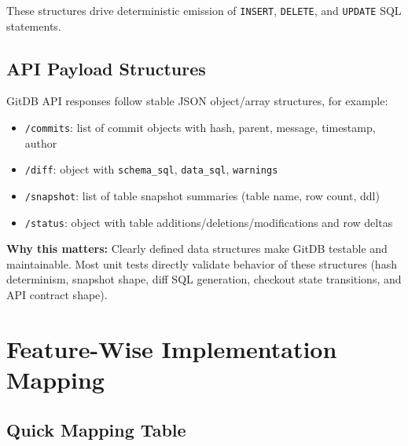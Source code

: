 \documentclass[12pt, a4paper]{article}
\begin{document}
These structures drive deterministic emission of \texttt{INSERT},
\texttt{DELETE}, and \texttt{UPDATE} SQL statements.

\subsection{API Payload Structures}

GitDB API responses follow stable JSON object/array structures, for example:
\begin{itemize}[leftmargin=1.5em]
        \item \texttt{/commits}: list of commit objects with hash, parent, message, timestamp, author
        \item \texttt{/diff}: object with \texttt{schema\_sql}, \texttt{data\_sql}, \texttt{warnings}
        \item \texttt{/snapshot}: list of table snapshot summaries (table name, row count, ddl)
        \item \texttt{/status}: object with table additions/deletions/modifications and row deltas
\end{itemize}

\begin{tcolorbox}[fixbox]
\textbf{Why this matters:}
Clearly defined data structures make GitDB testable and maintainable. Most unit
tests directly validate behavior of these structures (hash determinism, snapshot
shape, diff SQL generation, checkout state transitions, and API contract shape).
\end{tcolorbox}

\section{Feature-Wise Implementation Mapping}

\subsection{Quick Mapping Table}
\end{document}
